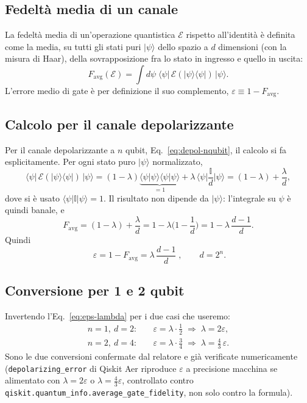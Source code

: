 \documentclass[11pt,a4paper]{article}
\newcommand{\ket}[1]{\lvert #1 \rangle}
\newcommand{\bra}[1]{\langle #1 \rvert}
\begin{document}
\subsection{Fedeltà media di un canale}

La fedeltà media di un'operazione quantistica $\mathcal E$ rispetto all'identità è
definita come la media, su tutti gli stati puri $\ket\psi$ dello spazio a $d$
dimensioni (con la misura di Haar), della sovrapposizione fra lo stato in ingresso e
quello in uscita:
\begin{equation}
F_\text{avg}(\mathcal E) = \int d\psi\;\bra\psi\,\mathcal E(\ket\psi\bra\psi)\,\ket\psi .
\end{equation}
L'errore medio di gate è per definizione il suo complemento, $\varepsilon \equiv
1-F_\text{avg}$.

\subsection{Calcolo per il canale depolarizzante}

Per il canale depolarizzante a $n$ qubit, Eq.~\eqref{eq:depol-nqubit}, il calcolo si fa
esplicitamente. Per ogni stato puro $\ket\psi$ normalizzato,
\begin{equation}
\bra\psi\,\mathcal E(\ket\psi\bra\psi)\,\ket\psi =
(1-\lambda)\underbrace{\bra\psi\psi\rangle\langle\psi\ket\psi}_{=1} +
\lambda\,\bra\psi\frac{\mathbb{I}}{d}\ket\psi =
(1-\lambda) + \frac{\lambda}{d},
\end{equation}
dove si è usato $\bra\psi\mathbb{I}\ket\psi=1$. Il risultato non dipende da
$\ket\psi$: l'integrale su $\psi$ è quindi banale, e
\begin{equation}
F_\text{avg} = (1-\lambda) + \frac{\lambda}{d} = 1-\lambda\Big(1-\frac1d\Big)
= 1-\lambda\,\frac{d-1}{d}.
\end{equation}
Quindi
\begin{equation}
\boxed{\;\varepsilon = 1-F_\text{avg} = \lambda\,\frac{d-1}{d}\;}, \qquad d=2^n.
\label{eq:eps-lambda}
\end{equation}

\subsection{Conversione per 1 e 2 qubit}

Invertendo l'Eq.~\eqref{eq:eps-lambda} per i due casi che useremo:
\begin{align}
n=1,\ d=2:&\quad \varepsilon = \lambda\cdot\frac12 \;\Longrightarrow\; \lambda = 2\varepsilon, \\[4pt]
n=2,\ d=4:&\quad \varepsilon = \lambda\cdot\frac34 \;\Longrightarrow\; \lambda = \frac43\,\varepsilon.
\end{align}
Sono le due conversioni confermate dal relatore e già verificate numericamente
(\texttt{depolarizing\_\allowbreak error} di Qiskit Aer riproduce $\varepsilon$ a
precisione macchina se alimentato con $\lambda=2\varepsilon$ o
$\lambda=\tfrac43\varepsilon$,
controllato contro \texttt{qiskit.quantum\_info.\allowbreak average\_gate\_fidelity},
non solo contro la formula).
\end{document}
